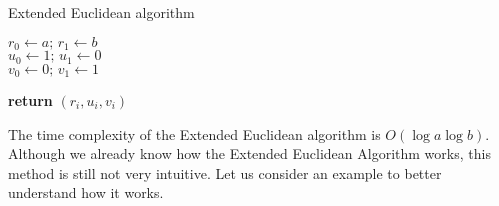 \documentclass[../lecture-notes-148x210.tex]{subfiles}
\begin{document}
\begin{algorithm}[H]
    \caption{Extended Euclidean algorithm} \label{alg:extended_euclidean}
        
    $r_{0} \gets a; \, r_{1} \gets b$ \\
    $u_{0} \gets 1; \, u_{1} \gets 0$ \\
    $v_{0} \gets 0; \, v_{1} \gets 1$ \\


    \textbf{return} $(r_i, u_i, v_i)$
\end{algorithm}

The time complexity of the Extended Euclidean algorithm is $O(\log{a} \log{b})$.
Although we already know how the Extended Euclidean Algorithm works, this method
is still not very intuitive. Let us consider an example to better understand how
it works.
\end{document}

